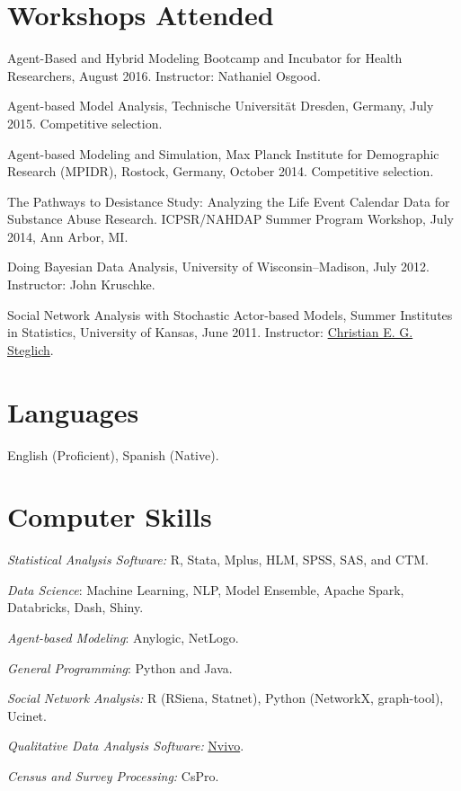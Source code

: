 \documentclass[10pt,letterpaper]{article}
\renewenvironment{itemize}{
  \begin{list}{}{
    \setlength{\leftmargin}{1.5em}
    \setlength{\itemsep}{0.25em}
    \setlength{\parskip}{0pt}
    \setlength{\parsep}{0.25em}
  }
}{
  \end{list}
}
\begin{document}
\section*{Workshops Attended}

\begin{itemize}


\item Agent-Based and Hybrid Modeling Bootcamp and Incubator for Health Researchers, August 2016. Instructor: Nathaniel Osgood.
\item Agent-based Model Analysis, Technische Universität Dresden, Germany, July 2015. Competitive selection.
\item Agent-based Modeling and Simulation, Max Planck Institute for Demographic Research (MPIDR), Rostock, Germany, October 2014. Competitive selection.
\item The Pathways to Desistance Study: Analyzing the Life Event Calendar Data for Substance Abuse Research. ICPSR/NAHDAP Summer Program Workshop, July 2014, Ann Arbor, MI.
\item Doing Bayesian Data Analysis, University of Wisconsin--Madison, July 2012. Instructor: John Kruschke.
\item Social Network Analysis with Stochastic Actor-based Models, Summer Institutes in Statistics,  University of Kansas, June 2011. Instructor: \href{http://www.ppsw.rug.nl/~steglich/sites/index.htm}{Christian E. G. Steglich}.

 \end{itemize}

\section*{Languages}

\begin{itemize}
\item English (Proficient), Spanish (Native).
\end{itemize}

\section*{Computer Skills}

\begin{itemize}
\item \textit{Statistical Analysis Software:} R, Stata, Mplus, HLM, SPSS, SAS, and CTM.
\item \textit{Data Science}: Machine Learning, NLP, Model Ensemble, Apache Spark, Databricks, Dash, Shiny.
\item \textit{Agent-based Modeling}: Anylogic, NetLogo.
\item \textit{General Programming}: Python and Java.
\item \textit{Social Network Analysis:} R (RSiena, Statnet), Python (NetworkX, graph-tool), Ucinet.
\item \textit{Qualitative Data Analysis Software:} \href{http://www.qsrinternational.com/}{Nvivo}.
\item \textit{Census and Survey Processing:} CsPro.
\end{itemize}
\end{document}
